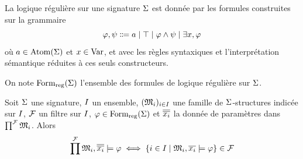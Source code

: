 \begin{definition}
  La logique régulière sur une signature $\Sigma$ est donnée par les formules
  construites sur la grammaire
  \[\varFF,\varFP\inddefeq
  a\mid \top\mid\varFF\land\varFP\mid\exists x, \varFF\]
  où $a \in \operatorname{Atom}(\Sigma)$ et $x \in \operatorname{Var}$, et avec les règles syntaxiques et
  l'interprétation sémantique réduites à ces seuls constructeurs.

  On note $\operatorname{Form}_{\mathrm{reg}}(\Sigma)$ l'ensemble des formules de logique régulière sur
  $\Sigma$.
\end{definition}

\begin{proposition}\label{prop.Los.faible}
  Soit $\Sigma$ une signature, $I$ un ensemble, $(\mathfrak{M}_i)_{i \in I}$
  une famille de $\Sigma$-structures indicée sur $I$, $\mathcal{F}$ un filtre
  sur $I$, $\varphi\in\operatorname{Form}_{\mathrm{reg}}(\Sigma)$ et $\overline{\overline{x_i}}$ la
  donnée de paramètres dans $\prod^{\mathcal{F}}\mathfrak{M}_i$. Alors
  \[\prod^{\mathcal{F}} \mathfrak{M}_i,\overline{\overline{x_i}}\models \varphi \iff
  \left\{ i \in I \;\middle\vert\; \mathfrak{M}_i,\overline{x_i} \models \varphi \right\}
  \in \mathcal{F}\]
\end{proposition}

